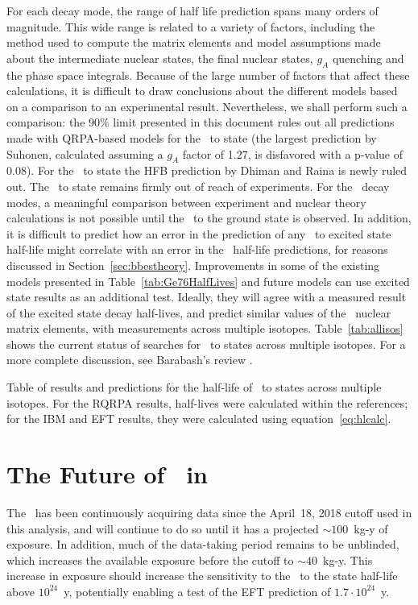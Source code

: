 \documentclass[/main.tex]{subfiles}
\begin{document}
For each decay mode, the range of half life prediction spans many orders of magnitude.
This wide range is related to a variety of factors, including the method used to compute the matrix elements and model assumptions made about the intermediate nuclear states, the final nuclear states, $g_A$ quenching and the phase space integrals.
Because of the large number of factors that affect these calculations, it is difficult to draw conclusions about the different models based on a comparison to an experimental result.
Nevertheless, we shall perform such a comparison: the 90\% limit presented in this document rules out all predictions made with QRPA-based models for the \tnbb\ to  state (the largest prediction by Suhonen\cite{gerdaESresult}, calculated assuming a $g_A$ factor of 1.27, is disfavored with a p-value of 0.08).
For the \tnbb\ to  state the HFB prediction by Dhiman and Raina\cite{dhiman1994} is newly ruled out.
The \tnbb\ to  state remains firmly out of reach of experiments.
For the \znbb\ decay modes, a meaningful comparison between experiment and nuclear theory calculations is not possible until the \znbb\ to the ground state is observed.
In addition, it is difficult to predict how an error in the prediction of any \tnbb\ to excited state half-life might correlate with an error in the \znbb\ half-life predictions, for reasons discussed in Section~\ref{sec:bbestheory}.
Improvements in some of the existing models presented in Table~\ref{tab:Ge76HalfLives} and future models can use excited state results as an additional test.
Ideally, they will agree with a measured result of the excited state decay half-lives, and predict similar values of the \znbb\ nuclear matrix elements, with measurements across multiple isotopes.
Table~\ref{tab:allisos} shows the current status of searches for \tnbb\ to  states across multiple isotopes.
For a more complete discussion, see Barabash's review \cite{barabash2017}. 
\begin{table}
  \centering
  \caption[Table of \tnbb\ to  states across multiple isotopes]{\label{tab:allisos}
    Table of results and predictions for the half-life of \tnbb\ to  states across multiple isotopes. For the RQRPA results, half-lives were calculated within the references; for the IBM and EFT results, they were calculated using equation~\ref{eq:hlcalc}.
  }
  
\end{table}

\section{The Future of \bbes\ in }
The \MJD\ has been continuously acquiring data since the April~18, 2018 cutoff used in this analysis, and will continue to do so until it has a projected ${\sim}100$~kg-y of exposure.
In addition, much of the data-taking period remains to be unblinded, which increases the available exposure before the cutoff to ${\sim}40$~kg-y.
This increase in exposure should increase the sensitivity to the \bbes\ to the  state half-life above $10^{24}$~y, potentially enabling a test of the EFT prediction of $1.7\cdot10^{24}$~y\cite{menendez2018}.
\end{document}
